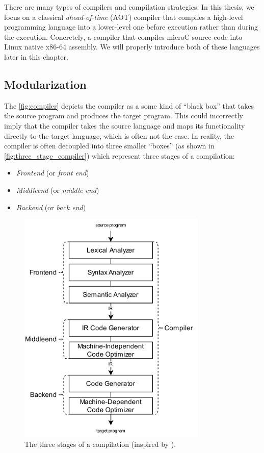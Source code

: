 \documentclass[thesis=M,english]{FITthesis}[2019/12/23]
\begin{document}
\pagebreak

There are many types of compilers and compilation strategies. In this thesis, we focus on a classical \emph{ahead-of-time} (AOT) compiler that compiles a high-level programming language into a lower-level one before execution rather than during the execution. Concretely, a compiler that compiles microC source code into Linux native x86-64 assembly. We will properly introduce both of these languages later in this chapter.

\subsection{Modularization}\label{ssec:modularization}
The \autoref{fig:compiler} depicts the compiler as a some kind of “black box” that takes the source program and produces the target program. This could incorrectly imply that the compiler takes the source language and maps its functionality directly to the target language, which is often not the case. In reality, the compiler is often decoupled into three smaller “boxes” (as shown in \autoref{fig:three_stage_compiler}) which represent three stages of a compilation:

\begin{itemize}
    \item \emph{Frontend} (or \emph{front end})
    \item \emph{Middleend} (or \emph{middle end})
    \item \emph{Backend} (or \emph{back end})
\end{itemize}

\begin{figure}
    \centering
    \includegraphics[width=9cm]{img/modern_compiler.png}
    \caption[The three stages of a compilation.]{The three stages of a compilation (inspired by \cite[Fig. 1.6]{dragonbook}).}\label{fig:three_stage_compiler}
\end{figure}
\end{document}
